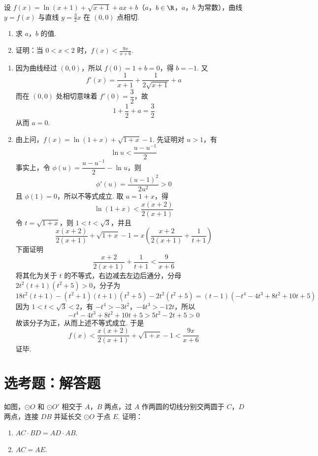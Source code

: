 \begin{problem}
设 \(f(x) = \ln (x + 1) + \sqrt{x + 1} + ax + b\)（\(a\)，\(b \in \R\)，\(a\)，\(b\) 为常数），曲线 \(y = f(x)\) 与直线 \(y = \frac{3}{2} x\) 在 \((0,0)\) 点相切.

\begin{enumerate}
\item 求 \(a\)，\(b\) 的值.
\item 证明：当 \(0 < x < 2\) 时，\(f(x) < \frac{9x}{x + 6}\).
\end{enumerate}
\end{problem}

\begin{solution}
\begin{enumerate}
\item 因为曲线经过 \((0,0)\)，所以 \(f(0)=1+b=0\)，得 \(b=-1\). 又
\[
f'(x)=\frac1{x+1}+\frac1{2\sqrt{x+1}}+a
\]
而在 \((0,0)\) 处相切意味着 \(f'(0)=\dfrac32\)，故
\[
1+\frac12+a=\frac32
\]
从而 \(a=0\).
\item 由上问，\(f(x)=\ln(1+x)+\sqrt{1+x}-1\). 先证明对 \(u>1\)，有
\[
\ln u<\frac{u-u^{-1}}2
\]
事实上，令 \(\phi(u)=\dfrac{u-u^{-1}}2-\ln u\)，则
\[
\phi'(u)=\frac{(u-1)^2}{2u^2}>0
\]
且 \(\phi(1)=0\)，所以不等式成立. 取 \(u=1+x\)，得
\[
\ln(1+x)<\frac{x(x+2)}{2(x+1)}
\]
令 \(t=\sqrt{1+x}\)，则 \(1<t<\sqrt3\)，并且
\[
\frac{x(x+2)}{2(x+1)}+\sqrt{1+x}-1
=x\left(\frac{x+2}{2(x+1)}+\frac1{t+1}\right)
\]
下面证明
\[
\frac{x+2}{2(x+1)}+\frac1{t+1}<\frac9{x+6}
\]
将其化为关于 \(t\) 的不等式，右边减去左边后通分，分母 \(2t^2(t+1)(t^2+5)>0\)，分子为
\[
18t^2(t+1)-(t^2+1)(t+1)(t^2+5)-2t^2(t^2+5)
=(t-1)(-t^4-4t^3+8t^2+10t+5)
\]
因为 \(1<t<\sqrt3<2\)，有 \(-t^4>-3t^2\)，\(-4t^3>-12t\)，所以
\[
-t^4-4t^3+8t^2+10t+5>5t^2-2t+5>0
\]
故该分子为正，从而上述不等式成立. 于是
\[
f(x)<\frac{x(x+2)}{2(x+1)}+\sqrt{1+x}-1<\frac{9x}{x+6}
\]
证毕.
\end{enumerate}
\end{solution}

\section{选考题：解答题}

\begin{problem}
如图，\(\odot O\) 和 \(\odot O'\) 相交于 \(A\)，\(B\) 两点，过 \(A\) 作两圆的切线分别交两圆于 \(C\)，\(D\) 两点，连接 \(DB\) 并延长交 \(\odot O\) 于点 \(E\). 证明：

\begin{enumerate}
\item \(AC \cdot BD = AD \cdot AB\).
\item \(AC = AE\).
\end{enumerate}

\end{problem}


